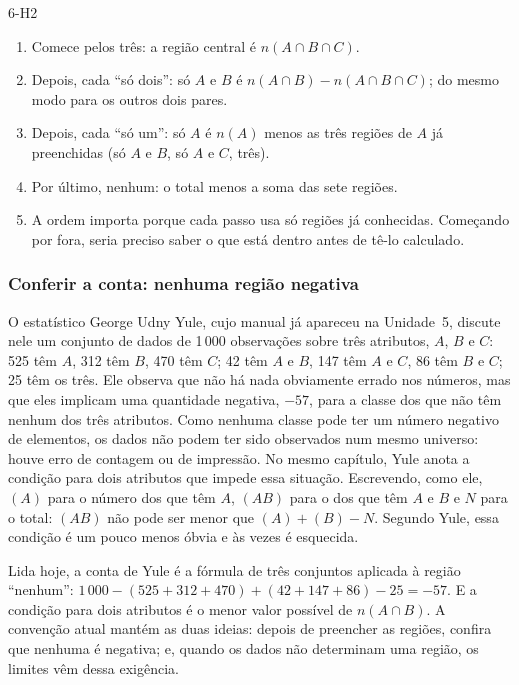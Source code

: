 \begin{construcao}{6-H2}
\begin{enumerate}[label=(\arabic*)]
  \item Comece pelos três: a região central é $n(A\cap B\cap C)$.
  \item Depois, cada \enquote{só dois}: só $A$ e $B$ é $n(A\cap B)-n(A\cap B\cap C)$; do mesmo modo para os outros dois pares.
  \item Depois, cada \enquote{só um}: só $A$ é $n(A)$ menos as três regiões de $A$ já preenchidas (só $A$ e $B$, só $A$ e $C$, três).
  \item Por último, nenhum: o total menos a soma das sete regiões.
  \item A ordem importa porque cada passo usa só regiões já conhecidas. Começando por fora, seria preciso saber o que está dentro antes de tê-lo calculado.
\end{enumerate}
\end{construcao}

\subsubsection{Conferir a conta: nenhuma região negativa}
O estatístico George Udny Yule, cujo manual já apareceu na Unidade~5, discute nele um conjunto de dados de 1\,000 observações sobre três atributos, $A$, $B$ e $C$: 525 têm $A$, 312 têm $B$, 470 têm $C$; 42 têm $A$ e $B$, 147 têm $A$ e $C$, 86 têm $B$ e $C$; 25 têm os três. Ele observa que não há nada obviamente errado nos números, mas que eles implicam uma quantidade negativa, $-57$, para a classe dos que não têm nenhum dos três atributos. Como nenhuma classe pode ter um número negativo de elementos, os dados não podem ter sido observados num mesmo universo: houve erro de contagem ou de impressão. No mesmo capítulo, Yule anota a condição para dois atributos que impede essa situação. Escrevendo, como ele, $(A)$ para o número dos que têm $A$, $(AB)$ para o dos que têm $A$ e $B$ e $N$ para o total: $(AB)$ não pode ser menor que $(A)+(B)-N$. Segundo Yule, essa condição é um pouco menos óbvia e às vezes é esquecida.

Lida hoje, a conta de Yule é a fórmula de três conjuntos aplicada à região \enquote{nenhum}: $1\,000-(525+312+470)+(42+147+86)-25=-57$. E a condição para dois atributos é o menor valor possível de $n(A\cap B)$. A convenção atual mantém as duas ideias: depois de preencher as regiões, confira que nenhuma é negativa; e, quando os dados não determinam uma região, os limites vêm dessa exigência.

